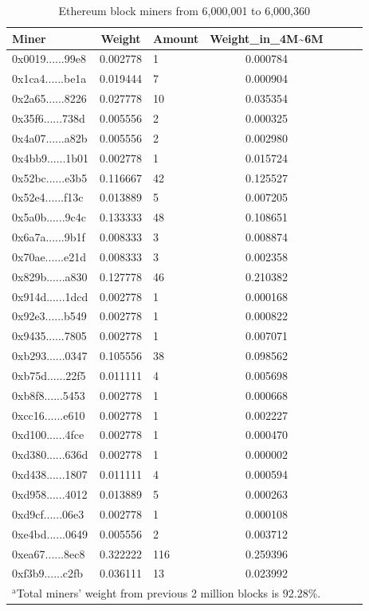 \documentclass[conference]{IEEEtran}
\begin{document}
\begin{table}[htbp]
\caption{Ethereum block miners from 6,000,001 to 6,000,360}
\begin{center}
\begin{tabular}{lclclcl}
\hline
Miner                                      & Weight   & Amount & Weight\_in\_4M\textasciitilde6M \\
\hline
0x0019......99e8 & 0.002778 & 1 & 0.000784  \\
0x1ca4......be1a & 0.019444 & 7 & 0.000904  \\
0x2a65......8226 & 0.027778 & 10 & 0.035354  \\
0x35f6......738d	 & 0.005556 & 2 & 0.000325  \\
0x4a07......a82b & 0.005556 & 2 & 0.002980  \\
0x4bb9......1b01 & 0.002778 & 1 & 0.015724  \\
0x52bc......e3b5 & 0.116667 & 42 & 0.125527  \\
0x52e4......f13c	 & 0.013889 & 5 & 0.007205  \\
0x5a0b......9c4c & 0.133333 & 48 & 0.108651  \\
0x6a7a......9b1f	 & 0.008333 & 3 & 0.008874  \\
0x70ae......e21d & 0.008333 & 3 & 0.002358  \\
0x829b......a830 & 0.127778 & 46 & 0.210382  \\
0x914d......1dcd & 0.002778 & 1 & 0.000168  \\
0x92e3......b549 & 0.002778 & 1 & 0.000822  \\
0x9435......7805 & 0.002778 & 1 & 0.007071  \\
0xb293......0347 & 0.105556 & 38 & 0.098562  \\
0xb75d......22f5	 & 0.011111 & 4	 & 0.005698  \\
0xb8f8......5453	 & 0.002778 & 1 & 0.000668  \\
0xcc16......e610 & 0.002778 & 1 & 0.002227  \\
0xd100......4fce	 & 0.002778 & 1 & 0.000470  \\
0xd380......636d & 0.002778 & 1 & 0.000002  \\
0xd438......1807 & 0.011111 & 4 & 0.000594  \\
0xd958......4012 & 0.013889 & 5 & 0.000263  \\
0xd9cf......06e3	 & 0.002778 & 1 & 0.000108  \\
0xe4bd......0649 & 0.005556 & 2 & 0.003712  \\
0xea67......8ec8 & 0.322222 & 116 & 0.259396  \\
0xf3b9......c2fb & 0.036111 & 13 & 0.023992  \\

\hline
\multicolumn{4}{l}{$^{\mathrm{a}}$Total miners' weight from previous 2 million blocks is 92.28\%.}
\end{tabular}
\end{center}
\end{table}
\end{document}
